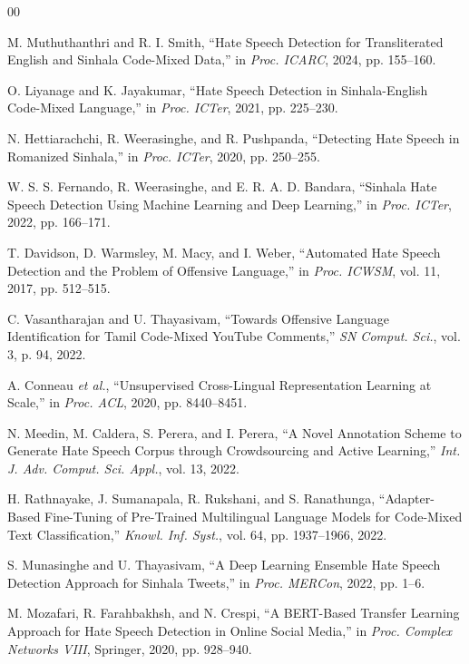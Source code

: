 \documentclass[journal]{IEEEtran}
\begin{document}
\begin{thebibliography}{00}

 M. Muthuthanthri and R. I. Smith, ``Hate
Speech Detection for Transliterated English and Sinhala Code-Mixed
Data,'' in \textit{Proc. ICARC}, 2024, pp. 155--160.

 O. Liyanage and K. Jayakumar, ``Hate Speech
Detection in Sinhala-English Code-Mixed Language,'' in \textit{Proc.
ICTer}, 2021, pp. 225--230.

 N. Hettiarachchi, R. Weerasinghe, and R.
Pushpanda, ``Detecting Hate Speech in Romanized Sinhala,'' in
\textit{Proc. ICTer}, 2020, pp. 250--255.

 W. S. S. Fernando, R. Weerasinghe, and E. R. A. D.
Bandara, ``Sinhala Hate Speech Detection Using Machine Learning and Deep
Learning,'' in \textit{Proc. ICTer}, 2022, pp. 166--171.

 T. Davidson, D. Warmsley, M. Macy, and I. Weber,
``Automated Hate Speech Detection and the Problem of Offensive
Language,'' in \textit{Proc. ICWSM}, vol. 11, 2017, pp. 512--515.

 C. Vasantharajan and U. Thayasivam, ``Towards
Offensive Language Identification for Tamil Code-Mixed YouTube
Comments,'' \textit{SN Comput. Sci.}, vol. 3, p. 94, 2022.

 A. Conneau \textit{et al.}, ``Unsupervised
Cross-Lingual Representation Learning at Scale,'' in \textit{Proc. ACL},
2020, pp. 8440--8451.

 N. Meedin, M. Caldera, S. Perera, and I. Perera, ``A
Novel Annotation Scheme to Generate Hate Speech Corpus through
Crowdsourcing and Active Learning,'' \textit{Int. J. Adv. Comput. Sci.
Appl.}, vol. 13, 2022.

 H. Rathnayake, J. Sumanapala, R. Rukshani, and
S. Ranathunga, ``Adapter-Based Fine-Tuning of Pre-Trained Multilingual
Language Models for Code-Mixed Text Classification,'' \textit{Knowl.
Inf. Syst.}, vol. 64, pp. 1937--1966, 2022.

 S. Munasinghe and U. Thayasivam, ``A Deep
Learning Ensemble Hate Speech Detection Approach for Sinhala Tweets,''
in \textit{Proc. MERCon}, 2022, pp. 1--6.

 M. Mozafari, R. Farahbakhsh, and N. Crespi, ``A
BERT-Based Transfer Learning Approach for Hate Speech Detection in
Online Social Media,'' in \textit{Proc. Complex Networks VIII},
Springer, 2020, pp. 928--940.


\end{thebibliography}
\end{document}
